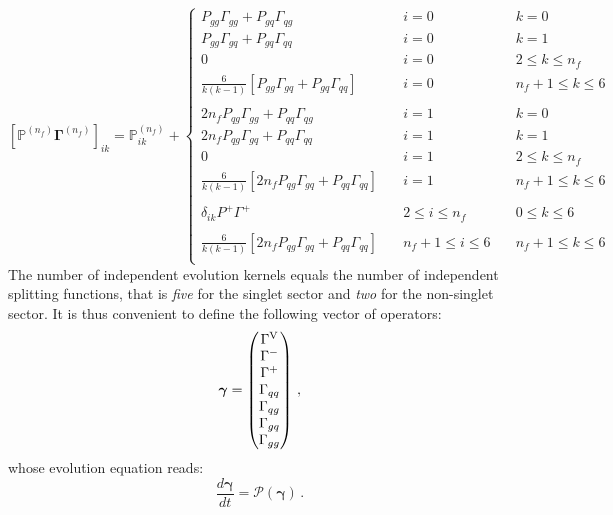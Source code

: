 \documentclass[10pt,a4paper]{article}
\begin{document}
\begin{equation}\label{eq:PGamma}
\left[\mathbb{P}^{(n_f)}{\bm\Gamma}^{(n_f)}\right]_{ik}=\mathbb{P}^{(n_f)}_{ik}+
\left\{
\begin{array}{lll}
P_{gg}\Gamma_{gg}+P_{gq}\Gamma_{qg} & \quad i = 0 &\quad k = 0\\
P_{gg}\Gamma_{gq}+P_{gq}\Gamma_{qq} & \quad i = 0 & \quad k=1\\
0 &\quad i = 0 & \quad 2 \leq k \leq n_f\\
\frac{6}{k(k-1)}\left[ P_{gg}\Gamma_{gq}+P_{gq}\Gamma_{qq}\right]&\quad i = 0 & \quad n_f+1 \leq k \leq 6\\
\\
2n_fP_{qg}\Gamma_{gg}+P_{qq}\Gamma_{qg} & \quad i = 1 &\quad k = 0\\
2n_fP_{qg}\Gamma_{gq}+P_{qq}\Gamma_{qq} & \quad i = 1 & \quad k=1\\
0 &\quad i = 1 & \quad 2 \leq k \leq n_f\\
\frac{6}{k(k-1)} \left[2n_fP_{qg}\Gamma_{gq}+P_{qq}\Gamma_{qq}\right]&\quad i = 1 & \quad n_f+1 \leq k \leq 6\\
\\
\delta_{ik}P^+\Gamma^+ & \quad 2 \leq i \leq n_f & \quad 0 \leq k \leq 6\\
\\
\frac{6}{k(k-1)}\left[2n_fP_{qg}\Gamma_{gq}+P_{qq}\Gamma_{qq} \right]&\quad n_f+1 \leq i \leq 6 & \quad n_f+1 \leq k \leq 6\\
\end{array}
\right.
\end{equation}
 The number of independent
evolution kernels equals the number of independent splitting
functions, that is \textit{five} for the singlet sector and
\textit{two} for the non-singlet sector. It is thus convenient to
define the following vector of operators:
\begin{equation}
{\bm \gamma} =
\begin{pmatrix}
\Gamma^{\rm V}\\
\Gamma^-\\
\Gamma^+\\
\Gamma_{qq}\\
\Gamma_{qg}\\
\Gamma_{gq}\\
\Gamma_{gg}
\end{pmatrix}\,,
\end{equation}
whose evolution equation reads:
\begin{equation}\label{eq:DGLAPop}
  \frac{d{\bm \gamma}}{dt}=\mathcal{P}({\bm \gamma})\,.
\end{equation}
\end{document}
